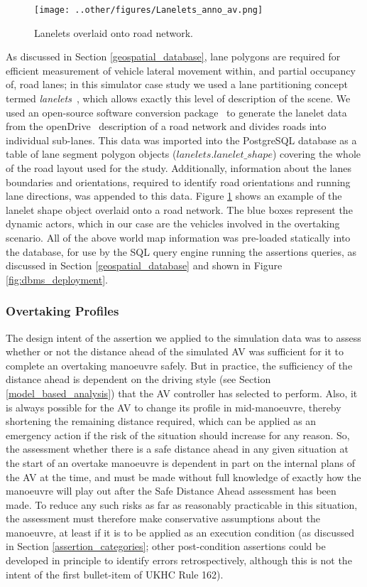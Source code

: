 \begin{figure}[htp]
    \centering
    \texttt{[image: ..other/figures/Lanelets\_anno\_av.png]}
    \caption{Lanelets overlaid onto road network.}
    \label{fig:lanelets}
\end{figure} 

As discussed in Section \ref{geospatial_database}, lane polygons are required for efficient measurement of vehicle lateral movement within, and partial occupancy of, road lanes; in this simulator case study we used a lane partitioning concept termed \textit{lanelets}~\cite{lanelets2014}, which allows exactly this level of description of the scene. We used an open-source software conversion package~\cite{lanelets_to_openDrive} to generate the lanelet data from the openDrive~\cite{opendrive} description of a road network and divides roads into individual sub-lanes. This data was imported into the PostgreSQL database as a table of lane segment polygon objects ($lanelets.lanelet\_shape$) covering the whole of the road layout used for the study. Additionally, information about the lanes boundaries and orientations, required to identify road orientations and running lane directions, was appended to this data. 
%
Figure \ref{fig:lanelets} shows an example of the lanelet shape object overlaid onto a road network. The blue boxes represent the dynamic actors, which in our case are the vehicles involved in the overtaking scenario. 
%
All of the above world map information was pre-loaded statically into the database, for use by the SQL query engine running the assertions queries, as discussed in Section \ref{geospatial_database} and shown in Figure \ref{fig:dbms_deployment}.

\subsubsection{Overtaking Profiles} \label{overtaking_profiles}
The design intent of the assertion we applied to the simulation data was to assess whether or not the distance ahead of the simulated AV was sufficient for it to complete an overtaking manoeuvre safely. But in practice, the sufficiency of the distance ahead is dependent on the driving style (see Section \ref{model_based_analysis}) that the AV controller has selected to perform. Also, it is always possible for the AV to change its profile in mid-manoeuvre, thereby shortening the remaining distance required, which can be applied as an emergency action if the risk of the situation should increase for any reason. 
So, the assessment whether there is a safe distance ahead in any given situation at the start of an overtake manoeuvre is dependent in part on the internal plans of the AV at the time, and must be made without full knowledge of exactly how the manoeuvre will play out after the Safe Distance Ahead assessment has been made. To reduce any such risks as far as reasonably practicable in this situation, the assessment must therefore make conservative assumptions about the manoeuvre, at least if it is to be applied as an execution condition (as discussed in Section \ref{assertion_categories}; other post-condition assertions could be developed in principle to identify errors retrospectively, although this is not the intent of the first bullet-item of UKHC Rule 162).

